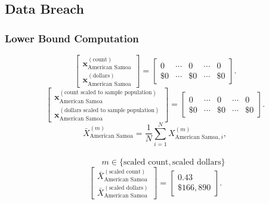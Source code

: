 \newpage
\subsection{Data Breach}
\subsubsection{Lower Bound Computation}
\[
\begin{bmatrix}
\mathbf{x}_{\text{American Samoa}}^{(\text{count})}\\
\mathbf{x}_{\text{American Samoa}}^{(\text{dollars})}
\end{bmatrix}
=
\begin{bmatrix}
0 & \cdots & 0 & \cdots & 0\\
\$0 & \cdots & \$0 & \cdots & \$0
\end{bmatrix}.
\]
\[
\begin{bmatrix}
\mathbf{x}_{\text{American Samoa}}^{(\text{count scaled to sample population})}\\
\mathbf{x}_{\text{American Samoa}}^{(\text{dollars scaled to sample population})}
\end{bmatrix}
=
\begin{bmatrix}
0 & \cdots & 0 & \cdots & 0\\
\$0 & \cdots & \$0 & \cdots & \$0
\end{bmatrix}.
\]
  \[
\bar{X}_{\text{American Samoa}}^{(m)}
= \frac{1}{N}\sum_{i=1}^{N} X_{\text{American Samoa},i}^{(m)},
\]
\\
\[
\qquad
m \in \{\text{scaled count},\text{scaled dollars}\}
\]
\[
\begin{bmatrix}
\bar{X}_{\text{American Samoa}}^{(\text{scaled count})}\\
\bar{X}_{\text{American Samoa}}^{(\text{scaled dollars})}
\end{bmatrix}
=
\begin{bmatrix}
0.43\\
\$166{,}890
\end{bmatrix}.
\]
